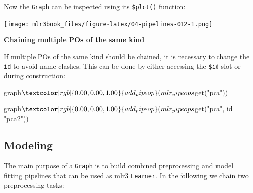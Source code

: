 \documentclass[]{article}
\newenvironment{Shaded}{}{}
\newcommand{\CommentTok}[1]{\textcolor[rgb]{0.00,0.50,0.00}{#1}}
\newcommand{\DataTypeTok}[1]{#1}
\newcommand{\KeywordTok}[1]{\textcolor[rgb]{0.00,0.00,1.00}{#1}}
\newcommand{\NormalTok}[1]{#1}
\newcommand{\OperatorTok}[1]{#1}
\newcommand{\OtherTok}[1]{\textcolor[rgb]{1.00,0.25,0.00}{#1}}
\newcommand{\StringTok}[1]{\textcolor[rgb]{0.00,0.50,0.50}{#1}}
\renewenvironment{Shaded} {\begin{snugshade}\small} {\end{snugshade}}
\begin{document}
Now the \href{https://mlr3pipelines.mlr-org.com/reference/Graph.html}{\texttt{Graph}} can be inspected using its \texttt{\$plot()} function:

\begin{Shaded}
\end{Shaded}

\texttt{[image: mlr3book\_files/figure-latex/04-pipelines-012-1.png]}

\textbf{Chaining multiple POs of the same kind}

If multiple POs of the same kind should be chained, it is necessary to change the \texttt{id} to avoid name clashes.
This can be done by either accessing the \texttt{\$id} slot or during construction:

\begin{Shaded}
\begin{Highlighting}[]
\NormalTok{graph}\OperatorTok{$}\KeywordTok{add_pipeop}\NormalTok{(mlr_pipeops}\OperatorTok{$}\KeywordTok{get}\NormalTok{(}\StringTok{"pca"}\NormalTok{))}
\end{Highlighting}
\end{Shaded}

\begin{Shaded}
\begin{Highlighting}[]
\NormalTok{graph}\OperatorTok{$}\KeywordTok{add_pipeop}\NormalTok{(mlr_pipeops}\OperatorTok{$}\KeywordTok{get}\NormalTok{(}\StringTok{"pca"}\NormalTok{, }\DataTypeTok{id =} \StringTok{"pca2"}\NormalTok{))}
\end{Highlighting}
\end{Shaded}

\hypertarget{pipe-modeling}{%
\subsection{Modeling}\label{pipe-modeling}}

The main purpose of a \href{https://mlr3pipelines.mlr-org.com/reference/Graph.html}{\texttt{Graph}} is to build combined preprocessing and model fitting pipelines that can be used as \href{https://mlr3.mlr-org.com}{mlr3} \href{https://mlr3.mlr-org.com/reference/Learner.html}{\texttt{Learner}}.
In the following we chain two preprocessing tasks:
\end{document}
